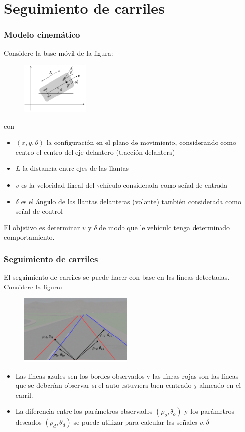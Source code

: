\section{Seguimiento de carriles}

\begin{frame}\frametitle{Modelo cinemático}
  Considere la base móvil de la figura:
  \begin{figure}
    \centering
    \includegraphics[width=0.3\textwidth]{Figuras/Ackermann.pdf}
  \end{figure}
  con
  \begin{itemize}
  \item $(x,y,\theta)$ la configuración en el plano de movimiento, considerando como centro el centro del eje delantero (tracción delantera)
  \item $L$ la distancia entre ejes de las llantas
  \item $v$ es la velocidad lineal del vehículo considerada como señal de entrada
  \item $\delta$ es el ángulo de las llantas delanteras (volante) también considerada como señal de control
  \end{itemize}
  El objetivo es determinar $v$ y $\delta$ de modo que le vehículo tenga determinado comportamiento.
\end{frame}

\begin{frame}\frametitle{Seguimiento de carriles}
  El seguimiento de carriles se puede hacer con base en las líneas detectadas. Considere la figura:
  \begin{figure}
    \centering
    \includegraphics[width=0.5\textwidth]{Figuras/LineErrors.pdf}
  \end{figure}
  \begin{itemize}
  \item Las líneas azules son los bordes observados y las líneas rojas son las líneas que se deberían observar si el auto estuviera bien centrado y alineado en el carril.
  \item La diferencia entre los parámetros observados $(\rho_o,\theta_o)$ y los parámetros deseados $(\rho_d, \theta_d)$ se puede utilizar para calcular las señales $v,\delta$
  \end{itemize}
\end{frame}

